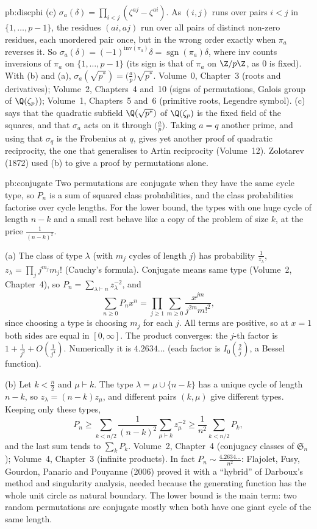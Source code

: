 \begin{solution}{pb:discphi}
(c) $\sigma_a(\delta)=\prod_{i<j}(\zeta^{aj}-\zeta^{ai})$. As $(i,j)$ runs over pairs $i<j$ in $\{1,\dots,p-1\}$, the residues
$(ai,aj)$ run over all pairs of distinct non-zero residues, each unordered pair once, but in the wrong order exactly when
$\pi_a$ reverses it. So $\sigma_a(\delta)=(-1)^{\mathrm{inv}(\pi_a)}\delta=\operatorname{sgn}(\pi_a)\delta$, where $\mathrm{inv}$
counts inversions of $\pi_a$ on $\{1,\dots,p-1\}$ (its sign is that of $\pi_a$ on $\Z/p\Z$, as $0$ is fixed). With (b) and
(a), $\sigma_a(\sqrt{p^*})=\bigl(\frac ap\bigr)\sqrt{p^*}$.
\tools Volume~0, Chapter~3 (roots and derivatives); Volume~2, Chapters~4 and~10 (signs of permutations, Galois group of
$\Q(\zeta_p)$); Volume~1, Chapters~5 and~6 (primitive roots, Legendre symbol).
\leads (c) says that the quadratic subfield $\Q(\sqrt{p^*})$ of $\Q(\zeta_p)$ is the fixed field of the squares, and that
$\sigma_a$ acts on it through $\bigl(\frac ap\bigr)$. Taking $a=q$ another prime, and using that $\sigma_q$ is the Frobenius
at $q$, gives yet another proof of quadratic reciprocity, the one that generalises to Artin reciprocity (Volume~12). Zolotarev
(1872) used (b) to give a proof by permutations alone.
\end{solution}

\begin{solution}{pb:conjugate}
\idea Two permutations are conjugate when they have the same cycle type, so $P_n$ is a sum of squared class probabilities, and
the class probabilities factorise over cycle lengths. For the lower bound, the types with one huge cycle of length $n-k$ and a
small rest behave like a copy of the problem of size $k$, at the price $\frac1{(n-k)^2}$.

\writeup (a) The class of type $\lambda$ (with $m_j$ cycles of length $j$) has probability $\frac1{z_\lambda}$, $z_\lambda=\prod_jj^{m_j}m_j!$
(Cauchy's formula). Conjugate means same type (Volume~2, Chapter~4), so $P_n=\sum_{\lambda\vdash n}z_\lambda^{-2}$, and
\[
\sum_{n\ge0}P_nx^n=\prod_{j\ge1}\sum_{m\ge0}\frac{x^{jm}}{j^{2m}m!^2},
\]
since choosing a type is choosing $m_j$ for each $j$. All terms are positive, so at $x=1$ both sides are equal in $[0,\infty]$. The
product converges: the $j$-th factor is $1+\frac1{j^2}+O(\frac1{j^4})$. Numerically it is $4.2634\ldots$ (each factor is
$I_0(\frac2j)$, a Bessel function).

(b) Let $k<\frac n2$ and $\mu\vdash k$. The type $\lambda=\mu\cup\{n-k\}$ has a unique cycle of length $n-k$, so
$z_\lambda=(n-k)z_\mu$, and different pairs $(k,\mu)$ give different types. Keeping only these types,
\[
P_n\ge\sum_{k<n/2}\frac1{(n-k)^2}\sum_{\mu\vdash k}z_\mu^{-2}\ge\frac1{n^2}\sum_{k<n/2}P_k,
\]
and the last sum tends to $\sum_kP_k$.
\tools Volume~2, Chapter~4 (conjugacy classes of $\mathfrak S_n$); Volume~4, Chapter~3 (infinite products).
\leads In fact $P_n\sim\frac{4.2634\ldots}{n^2}$: Flajolet, Fusy, Gourdon, Panario and Pouyanne (2006) proved it with a ``hybrid'' of
Darboux's method and singularity analysis, needed because the generating function has the whole unit circle as natural boundary.
The lower bound is the main term: two random permutations are conjugate mostly when both have one giant cycle of the same length.
\end{solution}

